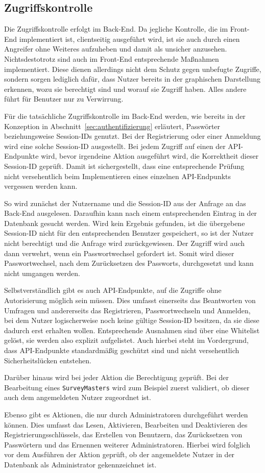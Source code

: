 \subsection{Zugriffskontrolle}
Die Zugriffskontrolle erfolgt im Back-End.
Da jegliche Kontrolle, die im Front-End implementiert ist, clientseitig ausgeführt wird, ist sie auch durch einen Angreifer ohne Weiteres aufzuheben und damit als unsicher anzusehen.
Nichtsdestotrotz sind auch im Front-End entsprechende Maßnahmen implementiert.
Diese dienen allerdings nicht dem Schutz gegen unbefugte Zugriffe, sondern sorgen lediglich dafür, dass Nutzer bereits in der graphischen Darstellung erkennen, wozu sie berechtigt sind und worauf sie Zugriff haben.
Alles andere führt für Benutzer nur zu Verwirrung.

Für die tatsächliche Zugriffskontrolle im Back-End werden, wie bereits in der Konzeption in Abschnitt~\ref{sec:authentifizierung} erläutert, Passwörter beziehungsweise Session-IDs genutzt.
Bei der Registrierung oder einer Anmeldung wird eine solche Session-ID ausgestellt.
Bei jedem Zugriff auf einen der \acs{API}-Endpunkte wird, bevor irgendeine Aktion ausgeführt wird, die Korrektheit dieser Session-ID geprüft.
Damit ist sichergestellt, dass eine entsprechende Prüfung nicht versehentlich beim Implementieren eines einzelnen \acs{API}-Endpunkts vergessen werden kann.

So wird zunächst der Nutzername und die Session-ID aus der Anfrage an das Back-End ausgelesen.
Daraufhin kann nach einem entsprechenden Eintrag in der Datenbank gesucht werden.
Wird kein Ergebnis gefunden, ist die übergebene Session-ID nicht für den entsprechenden Benutzer gespeichert, so ist der Nutzer nicht berechtigt und die Anfrage wird zurückgewiesen.
Der Zugriff wird auch dann verwehrt, wenn ein Passwortwechsel gefordert ist.
Somit wird dieser Passwortwechsel, \zb nach dem Zurücksetzen des Passworts, durchgesetzt und kann nicht umgangen werden.

Selbstverständlich gibt es auch \acs{API}-Endpunkte, auf die Zugriffe ohne Autorisierung möglich sein müssen.
Dies umfasst einerseits das Beantworten von Umfragen und andererseits das Registrieren, Passwortwechseln und Anmelden, bei dem Nutzer logischerweise noch keine gültige Session-ID besitzen, da sie diese dadurch erst erhalten wollen.
Entsprechende Ausnahmen sind über eine Whitelist gelöst, sie werden also explizit aufgelistet.
Auch hierbei steht im Vordergrund, dass \acs{API}-Endpunkte standardmäßig geschützt sind und nicht versehentlich Sicherheitslücken entstehen.

Darüber hinaus wird bei jeder Aktion die Berechtigung geprüft.
Bei der Bearbeitung eines \texttt{SurveyMasters} wird zum Beispiel zuerst validiert, ob dieser auch dem angemeldeten Nutzer zugeordnet ist.

Ebenso gibt es Aktionen, die nur durch Administratoren durchgeführt werden können.
Dies umfasst das Lesen, Aktivieren, Bearbeiten und Deaktivieren des Registrierungsschlüssels, das Erstellen von Benutzern, das Zurücksetzen von Passwörtern und das Ernennen weiterer Administratoren.
Hierbei wird folglich vor dem Ausführen der Aktion geprüft, ob der angemeldete Nutzer in der Datenbank als Administrator gekennzeichnet ist.
